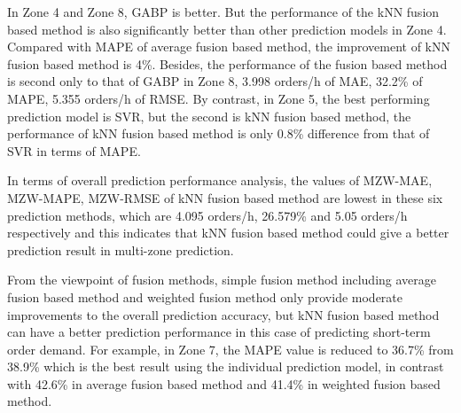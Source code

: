 \documentclass[sigconf]{acmart}
\begin{document}
In Zone 4 and Zone 8, GABP is better. But the performance of the kNN fusion based method is also significantly better than other prediction models in Zone 4. Compared with MAPE of average fusion based method, the improvement of kNN fusion based method is 4\%. Besides, the performance of the  fusion based method is second only to that of GABP in Zone 8, 3.998 orders/h of MAE, 32.2\% of MAPE, 5.355 orders/h of RMSE. By contrast, in Zone 5, the best performing prediction model is SVR, but the second is kNN fusion based method, the performance of kNN fusion based method is only 0.8\% difference from that of SVR in terms of MAPE.

In terms of overall prediction performance analysis, the values of MZW-MAE, MZW-MAPE, MZW-RMSE of kNN fusion based method are lowest in these six prediction methods, which are 4.095 orders/h, 26.579\% and 5.05 orders/h respectively and this indicates that kNN fusion based method could give a better prediction result in multi-zone prediction.

From the viewpoint of fusion methods, simple fusion method including average fusion based method and weighted fusion method only provide moderate improvements to the overall prediction accuracy, but kNN fusion based method can have a better prediction performance in this case of predicting short-term order demand. For example, in Zone 7, the MAPE value is reduced to 36.7\% from 38.9\% which is the best result using the individual prediction model, in contrast with 42.6\% in average fusion based method and 41.4\% in weighted fusion based method.
\end{document}
